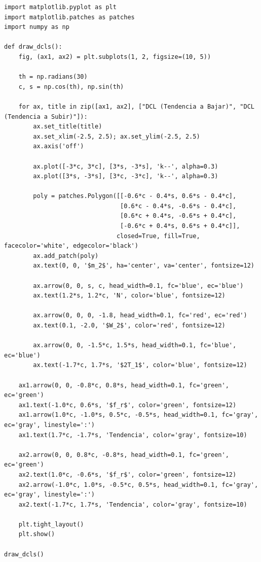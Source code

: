 \documentclass[12pt, a4paper]{article}
\begin{document}
\begin{lstlisting}
import matplotlib.pyplot as plt
import matplotlib.patches as patches
import numpy as np

def draw_dcls():
    fig, (ax1, ax2) = plt.subplots(1, 2, figsize=(10, 5))
    
    th = np.radians(30)
    c, s = np.cos(th), np.sin(th)
    
    for ax, title in zip([ax1, ax2], ["DCL (Tendencia a Bajar)", "DCL (Tendencia a Subir)"]):
        ax.set_title(title)
        ax.set_xlim(-2.5, 2.5); ax.set_ylim(-2.5, 2.5)
        ax.axis('off')
        
        ax.plot([-3*c, 3*c], [3*s, -3*s], 'k--', alpha=0.3)
        ax.plot([3*s, -3*s], [3*c, -3*c], 'k--', alpha=0.3)
        
        poly = patches.Polygon([[-0.6*c - 0.4*s, 0.6*s - 0.4*c], 
                                [0.6*c - 0.4*s, -0.6*s - 0.4*c], 
                                [0.6*c + 0.4*s, -0.6*s + 0.4*c], 
                                [-0.6*c + 0.4*s, 0.6*s + 0.4*c]], 
                               closed=True, fill=True, facecolor='white', edgecolor='black')
        ax.add_patch(poly)
        ax.text(0, 0, '$m_2$', ha='center', va='center', fontsize=12)
        
        ax.arrow(0, 0, s, c, head_width=0.1, fc='blue', ec='blue')
        ax.text(1.2*s, 1.2*c, 'N', color='blue', fontsize=12)
        
        ax.arrow(0, 0, 0, -1.8, head_width=0.1, fc='red', ec='red')
        ax.text(0.1, -2.0, '$W_2$', color='red', fontsize=12)
        
        ax.arrow(0, 0, -1.5*c, 1.5*s, head_width=0.1, fc='blue', ec='blue')
        ax.text(-1.7*c, 1.7*s, '$2T_1$', color='blue', fontsize=12)
        
    ax1.arrow(0, 0, -0.8*c, 0.8*s, head_width=0.1, fc='green', ec='green')
    ax1.text(-1.0*c, 0.6*s, '$f_r$', color='green', fontsize=12)
    ax1.arrow(1.0*c, -1.0*s, 0.5*c, -0.5*s, head_width=0.1, fc='gray', ec='gray', linestyle=':')
    ax1.text(1.7*c, -1.7*s, 'Tendencia', color='gray', fontsize=10)
    
    ax2.arrow(0, 0, 0.8*c, -0.8*s, head_width=0.1, fc='green', ec='green')
    ax2.text(1.0*c, -0.6*s, '$f_r$', color='green', fontsize=12)
    ax2.arrow(-1.0*c, 1.0*s, -0.5*c, 0.5*s, head_width=0.1, fc='gray', ec='gray', linestyle=':')
    ax2.text(-1.7*c, 1.7*s, 'Tendencia', color='gray', fontsize=10)

    plt.tight_layout()
    plt.show()

draw_dcls()
\end{lstlisting}
\end{document}
